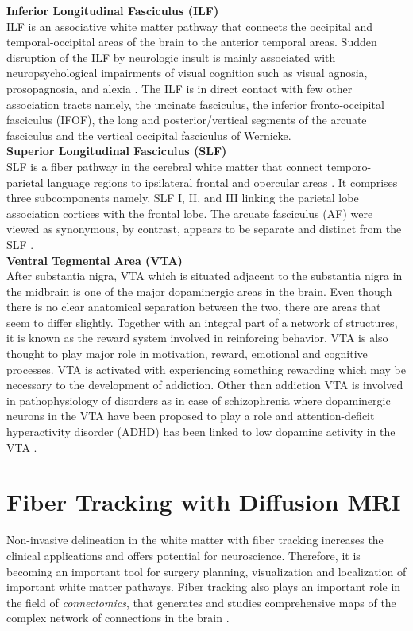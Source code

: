 \documentclass[../structure.tex]{subfiles}
\begin{document}
				
		\textbf{Inferior Longitudinal Fasciculus (ILF)}\\		
		ILF is an associative white matter pathway that connects the occipital and temporal-occipital areas of the brain to the anterior temporal areas.  Sudden disruption of the ILF by neurologic insult is mainly associated with  neuropsychological impairments of visual cognition such as visual agnosia, prosopagnosia, and alexia \cite{Herbet2018}. The ILF is in direct contact with few other association tracts namely, the uncinate fasciculus, the inferior fronto-occipital fasciculus (IFOF), the long and posterior/vertical segments of the arcuate fasciculus and the vertical occipital fasciculus of Wernicke.\\

		

		\textbf{Superior Longitudinal Fasciculus (SLF)}\\			
		SLF is a fiber pathway in the cerebral white matter that connect temporo-parietal language regions to ipsilateral frontal and opercular areas \cite{Madhavan2014}. It comprises three subcomponents namely, SLF I, II, and III linking the parietal lobe association cortices with the frontal lobe. The arcuate fasciculus (AF) were viewed as synonymous, by contrast, appears to be separate and distinct from the SLF \cite{Schmahmann2006}.\\
		
		
		\textbf{Ventral Tegmental Area (VTA)}\\
		After substantia nigra, VTA which is situated adjacent to the substantia nigra in the midbrain is one of the major dopaminergic areas in the brain. Even though there is no clear anatomical separation between the two, there are areas that seem to differ slightly. Together with an integral part of a network of structures, it is known as the reward system involved in reinforcing behavior. VTA is also thought to play major role in motivation, reward, emotional and cognitive processes. VTA is activated with experiencing something rewarding which may be necessary to the development of addiction. Other than addiction VTA is involved in pathophysiology of disorders as in case of schizophrenia where dopaminergic neurons in the VTA have been proposed to play a role and attention-deficit hyperactivity disorder (ADHD) has been linked to low dopamine activity in the VTA \cite{Kalivas1993}.\\
	
\section{Fiber Tracking with Diffusion MRI}
Non-invasive delineation in the white matter with fiber tracking increases the clinical applications and offers potential for neuroscience. Therefore, it is becoming an important tool for surgery planning, visualization and localization of important white matter pathways. Fiber tracking also plays an important role in the field of \textit{connectomics}, that generates and studies comprehensive maps of the complex network of connections in the brain \cite{Jeurissen2017}.
\end{document}
